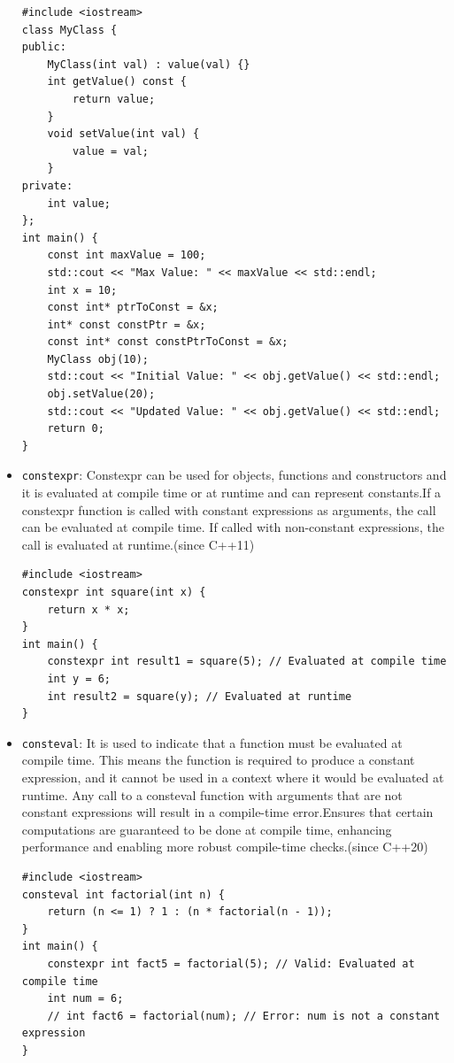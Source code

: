 \documentclass[12pt]{article}
\begin{document}
\begin{itemize}
    \begin{lstlisting}
#include <iostream>
class MyClass {
public:
    MyClass(int val) : value(val) {}
    int getValue() const {
        return value;
    }
    void setValue(int val) {
        value = val;
    }
private:
    int value;
};
int main() {
    const int maxValue = 100;
    std::cout << "Max Value: " << maxValue << std::endl;
    int x = 10;
    const int* ptrToConst = &x;
    int* const constPtr = &x;
    const int* const constPtrToConst = &x;
    MyClass obj(10);
    std::cout << "Initial Value: " << obj.getValue() << std::endl;
    obj.setValue(20);
    std::cout << "Updated Value: " << obj.getValue() << std::endl;
    return 0;
}
    \end{lstlisting}
    \item \texttt{constexpr}: Constexpr can be used for objects, functions and constructors and it is evaluated at compile time or at runtime and can represent constants.If a constexpr function is called with constant expressions as arguments, the call can be evaluated at compile time. If called with non-constant expressions, the call is evaluated at runtime.(since C++11)
    \begin{lstlisting}
#include <iostream>
constexpr int square(int x) {
    return x * x;
}
int main() {
    constexpr int result1 = square(5); // Evaluated at compile time
    int y = 6;
    int result2 = square(y); // Evaluated at runtime
}
    \end{lstlisting}
    \item \texttt{consteval}: It is used to indicate that a function must be evaluated at compile time. This means the function is required to produce a constant expression, and it cannot be used in a context where it would be evaluated at runtime. Any call to a consteval function with arguments that are not constant expressions will result in a compile-time error.Ensures that certain computations are guaranteed to be done at compile time, enhancing performance and enabling more robust compile-time checks.(since C++20)
    \begin{lstlisting}
#include <iostream>
consteval int factorial(int n) {
    return (n <= 1) ? 1 : (n * factorial(n - 1));
}
int main() {
    constexpr int fact5 = factorial(5); // Valid: Evaluated at compile time
    int num = 6;
    // int fact6 = factorial(num); // Error: num is not a constant expression
}


\end{lstlisting}
\end{itemize}
\end{document}
